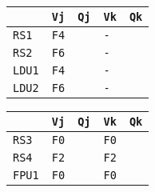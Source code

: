 \begin{enumerate}
    \begin{minipage}{0.45\textwidth}
        \centering
        \begin{tabular}{@{} l | l l l l @{}}
            \toprule
                & \texttt{Vj} & \texttt{Qj} & \texttt{Vk} & \texttt{Qk} \\
            \midrule
            \texttt{RS1} & \texttt{F4} & & \texttt{-} & \\ [.3em]
            \texttt{RS2} & \texttt{F6} & & \texttt{-} & \\
            \cmidrule{1-5}
            \texttt{LDU1} & \texttt{F4} & & \texttt{-} & \\ [.3em]
            \texttt{LDU2} & \texttt{F6} & & \texttt{-} & \\
            \bottomrule
        \end{tabular}
    \end{minipage}
    \hfill
    \begin{minipage}{0.45\textwidth}
        \centering
        \begin{tabular}{@{} l | l l l l @{}}
            \toprule
            & \texttt{Vj} & \texttt{Qj} & \texttt{Vk} & \texttt{Qk} \\
            \midrule
            \texttt{RS3} & \texttt{F0} & & \texttt{F0} & \\ [.3em]
            \texttt{RS4} & \texttt{F2} & & \texttt{F2} & \\
            \cmidrule{1-5}
            \texttt{FPU1} & \texttt{F0} & & \texttt{F0} & \\
            \bottomrule
        \end{tabular}
    \end{minipage}


\end{enumerate}
